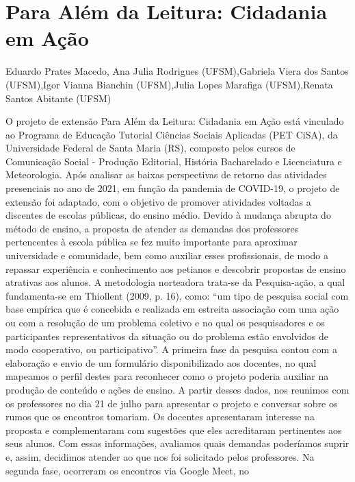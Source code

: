 

\section{Para Além da Leitura: Cidadania em Ação}

Eduardo Prates Macedo, Ana Julia Rodrigues (UFSM),Gabriela Viera dos Santos (UFSM),Igor Vianna Bianchin (UFSM),Julia Lopes Marafiga (UFSM),Renata Santos Abitante (UFSM)

O projeto de extensão Para Além da Leitura: Cidadania em Ação está vinculado ao Programa de 
Educação Tutorial Ciências Sociais Aplicadas (PET CiSA), da Universidade Federal de Santa 
Maria (RS), composto pelos cursos de Comunicação Social - Produção Editorial, História 
Bacharelado e Licenciatura e Meteorologia. Após analisar as baixas perspectivas de retorno das 
atividades presenciais no ano de 2021, em função da pandemia de COVID-19, o projeto de 
extensão foi adaptado, com o objetivo de promover atividades voltadas a discentes de escolas 
públicas, do ensino médio. Devido à mudança abrupta do método de ensino, a proposta de atender 
as demandas dos professores pertencentes à escola pública se fez muito importante para aproximar 
universidade e comunidade, bem como auxiliar esses profissionais, de modo a repassar experiência 
e conhecimento aos petianos e descobrir propostas de ensino atrativas aos alunos.
A metodologia norteadora trata-se da Pesquisa-ação, a qual fundamenta-se em Thiollent (2009, p. 
16), como: “um tipo de pesquisa social com base empírica que é concebida e realizada em estreita 
associação com uma ação ou com a resolução de um problema coletivo e no qual os pesquisadores 
e os participantes representativos da situação ou do problema estão envolvidos de modo 
cooperativo, ou participativo”. A primeira fase da pesquisa contou com a elaboração e envio de 
um formulário disponibilizado aos docentes, no qual mapeamos o perfil destes para reconhecer 
como o projeto poderia auxiliar na produção de conteúdo e ações de ensino. A partir desses dados, 
nos reunimos com os professores no dia 21 de julho para apresentar o projeto e conversar sobre os 
rumos que os encontros tomariam. Os docentes apresentaram interesse na proposta e 
complementaram com sugestões que eles acreditaram pertinentes aos seus alunos. Com essas 
informações, avaliamos quais demandas poderíamos suprir e, assim, decidimos atender ao que nos 
foi solicitado pelos professores. Na segunda fase, ocorreram os encontros via Google Meet, no 
